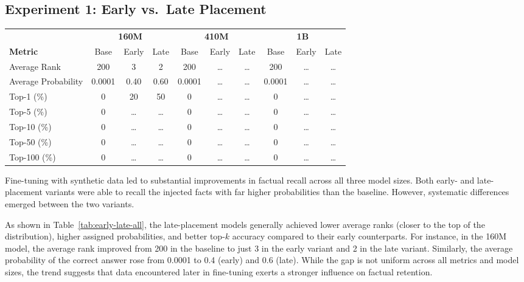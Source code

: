 \documentclass[11pt]{article}
\begin{document}
\subsection{Experiment 1: Early vs.\ Late Placement}
\begin{table*}[htbp]
\centering
\small
\begin{tabular}{l|ccc|ccc|ccc}
\hline
 & \multicolumn{3}{c|}{\textbf{160M}} & \multicolumn{3}{c|}{\textbf{410M}} & \multicolumn{3}{c}{\textbf{1B}} \\
\textbf{Metric} & Base & Early & Late & Base & Early & Late & Base & Early & Late \\
\hline
Average Rank        & 200    & 3      & 2      & 200    & \dots & \dots & 200    & \dots & \dots \\
Average Probability & 0.0001 & 0.40   & 0.60   & 0.0001 & \dots & \dots & 0.0001 & \dots & \dots \\
Top-1 (\%)          & 0      & 20     & 50     & 0      & \dots & \dots & 0      & \dots & \dots \\
Top-5 (\%)          & 0      & \dots  & \dots  & 0      & \dots & \dots & 0      & \dots & \dots \\
Top-10 (\%)         & 0      & \dots  & \dots  & 0      & \dots & \dots & 0      & \dots & \dots \\
Top-50 (\%)         & 0      & \dots  & \dots  & 0      & \dots & \dots & 0      & \dots & \dots \\
Top-100 (\%)        & 0      & \dots  & \dots  & 0      & \dots & \dots & 0      & \dots & \dots \\
\hline
\end{tabular}
\caption{Experiment 1: Early vs.\ late placement across all three model sizes.
Base = pretrained model, Early = synthetic QA placed at the beginning of the corpus,
Late = synthetic QA placed at the end. Replace \dots\ with actual measured values.}
\label{tab:early-late-all}
\end{table*}


Fine-tuning with synthetic data led to substantial improvements in factual recall across all three model sizes. Both early- and late-placement variants were able to recall the injected facts with far higher probabilities than the baseline. However, systematic differences emerged between the two variants.

As shown in Table~\ref{tab:early-late-all}, the late-placement models generally achieved lower average ranks (closer to the top of the distribution), higher assigned probabilities, and better top-$k$ accuracy compared to their early counterparts. For instance, in the 160M model, the average rank improved from 200 in the baseline to just 3 in the early variant and 2 in the late variant. Similarly, the average probability of the correct answer rose from 0.0001 to 0.4 (early) and 0.6 (late). While the gap is not uniform across all metrics and model sizes, the trend suggests that data encountered later in fine-tuning exerts a stronger influence on factual retention.
\end{document}
